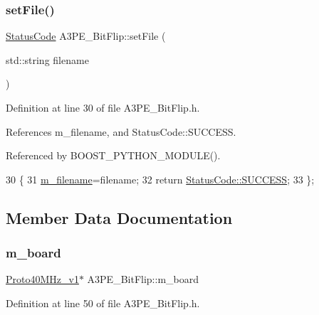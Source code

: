 \subsubsection{\texorpdfstring{set\+File()}{setFile()}}
{\footnotesize\ttfamily \hyperlink{classStatusCode}{Status\+Code} A3\+P\+E\+\_\+\+Bit\+Flip\+::set\+File (\begin{DoxyParamCaption}\item[{std\+::string}]{filename }\end{DoxyParamCaption})\hspace{0.3cm}{\ttfamily [inline]}}



Definition at line 30 of file A3\+P\+E\+\_\+\+Bit\+Flip.\+h.



References m\+\_\+filename, and Status\+Code\+::\+S\+U\+C\+C\+E\+SS.



Referenced by B\+O\+O\+S\+T\+\_\+\+P\+Y\+T\+H\+O\+N\+\_\+\+M\+O\+D\+U\+L\+E().


\begin{DoxyCode}
30                                          \{
31     \hyperlink{classA3PE__BitFlip_a72eecaff11d66c7f3eee10a9b2bfa301}{m\_filename}=filename;
32     \textcolor{keywordflow}{return} \hyperlink{classStatusCode_a6f565cbeadc76d14c72f047e5e85eb4badd0da38d3ba0d922efd1f4619bc37ad8}{StatusCode::SUCCESS};
33   \};
\end{DoxyCode}


\subsection{Member Data Documentation}
\mbox{\label{classA3PE__BitFlip_a2ade653b4fda5f531b5de28233cdb749}} 
\subsubsection{\texorpdfstring{m\+\_\+board}{m\_board}}
{\footnotesize\ttfamily \hyperlink{classProto40MHz__v1}{Proto40\+M\+Hz\+\_\+v1}$\ast$ A3\+P\+E\+\_\+\+Bit\+Flip\+::m\+\_\+board\hspace{0.3cm}{\ttfamily [private]}}



Definition at line 50 of file A3\+P\+E\+\_\+\+Bit\+Flip.\+h.



